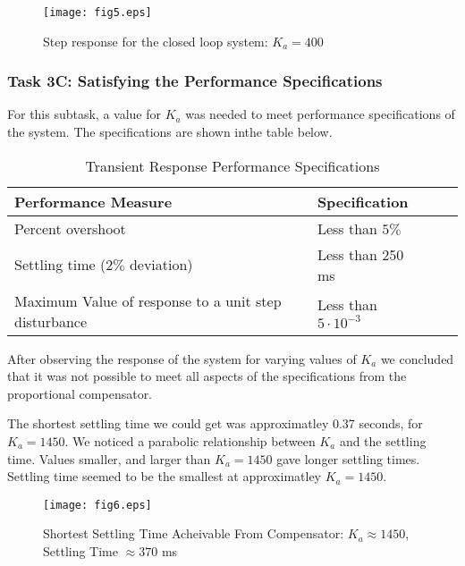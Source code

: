 \documentclass{article}
\newcommand{\matlab}[1]{%
%
}
\begin{document}
\matlab{fig5.m}

\begin{figure}[H]
  \caption{Step response for the closed loop system: $K_a = 400$}
  \centering
  \texttt{[image: fig5.eps]}
\end{figure}

\subsubsection*{Task 3C: Satisfying the Performance Specifications}

For this subtask, a value for $K_a$ was needed to meet performance 
specifications of the system. The specifications are shown inthe table below.

\begin{table}[H]
\begin{center}
  \begin{tabular}{ | l | l | l | p{5cm} |}
  \hline
  \textbf{Performance Measure} & \textbf{Specification}\\ \hline 
  Percent overshoot & Less than $5\%$ \\ \hline 
  Settling time ($2\%$ deviation) & Less than 250 ms \\ \hline 
  Maximum Value of response to a unit step disturbance & Less than 
  $5\cdot10^{-3}$ \\ \hline 
 \end{tabular}
\end{center}
\caption{Transient Response Performance Specifications}
\end{table}

After observing the response of the system for varying values of $K_a$ we
concluded that it was not possible to meet all aspects of the specifications
from the proportional compensator. 

The shortest settling time we could get was approximatley 0.37 seconds, for
$K_a = 1450$. We noticed a parabolic relationship between $K_a$ and the
settling time. Values smaller, and larger than $K_a = 1450$ gave longer
settling times. Settling time seemed to be the smallest at approximatley
$K_a = 1450$.

\matlab{fig6.m}

\begin{figure}[H]
  \caption{Shortest Settling Time Acheivable From Compensator: 
  $K_a \approx 1450$, Settling Time $\approx 370$ ms}
  \centering
  \texttt{[image: fig6.eps]}
\end{figure}
\end{document}
